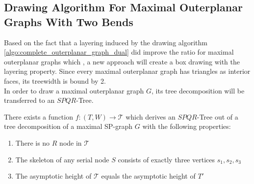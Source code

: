 \subsection{Drawing Algorithm For Maximal Outerplanar Graphs With Two Bends}

Based on the fact that a layering induced by the drawing algorithm \ref{algo:complete_outerplanar_graph_dual} did improve the ratio for maximal outerplanar graphs which , a new approach will create a box drawing with the layering property. Since every maximal outerplanar graph has triangles as interior faces, its treewidth is bound by 2.\\
In order to draw a maximal outerplanar graph $G$, its tree decomposition will be transferred to an $SPQR$-Tree. 

\begin{lemma}
	There exists a function $f: (T,W) \to \mathcal{T}$ which derives an $SPQR$-Tree out of a tree decomposition of a maximal SP-graph $G$ with the following properties:
	\begin{enumerate}
		\item There is no $R$ node in $\mathcal{T}$
		\item The skeleton of any serial node $S$ consists of exactly three vertices $s_1,s_2,s_3$
		\item The asymptotic height of $\mathcal{T}$ equals the asymptotic height of $T'$		
	\end{enumerate}\label{l:tree_decomp_to_SPQR}
\end{lemma}
